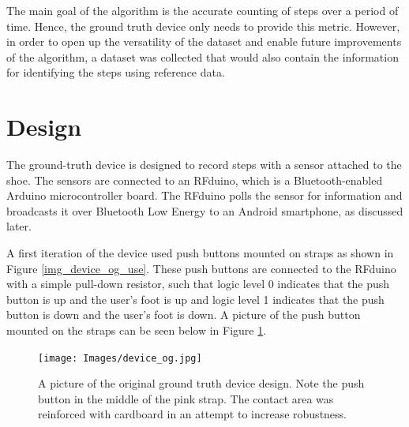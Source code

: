         The main goal of the algorithm is the accurate counting of steps over a period of time. Hence, the ground truth device only needs to provide this metric. However, in order to open up the versatility of the dataset and enable future improvements of the algorithm, a dataset was collected that would also contain the information for identifying the steps using reference data.

        \section{Design}

            The ground-truth device is designed to record steps with a sensor attached to the shoe. The sensors are connected to an RFduino, which is a Bluetooth-enabled Arduino microcontroller board. The RFduino polls the sensor for information and broadcasts it over Bluetooth Low Energy to an Android smartphone, as discussed later. 

            A first iteration of the device used push buttons mounted on straps as shown in Figure \ref{img_device_og_use}. These push buttons are connected to the RFduino with a simple pull-down resistor, such that logic level 0 indicates that the push button is up and the user's foot is up and logic level 1 indicates that the push button is down and the user's foot is down. A picture of the push button mounted on the straps can be seen below in Figure \ref{img_device_og}.

            \begin{figure}[!th]
                \texttt{[image: Images/device\_og.jpg]}
                \centering
                \caption{A picture of the original ground truth device design. Note the push button in the middle of the pink strap. The contact area was reinforced with cardboard in an attempt to increase robustness.}
                \label{img_device_og}
            \end{figure}

